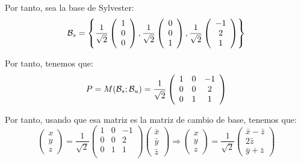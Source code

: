 \begin{ejercicio}
    Por tanto, sea la base de Sylvester:
    \begin{equation*}
        \mathcal{B}_s = \left\{\frac{1}{\sqrt{2}}\left(\begin{array}{c}
            1 \\ 0 \\ 0
        \end{array}\right),
        \frac{1}{\sqrt{2}}\left(\begin{array}{c}
            0 \\ 0 \\ 1
        \end{array}\right),
        \frac{1}{\sqrt{2}}\left(\begin{array}{c}
            -1 \\ 2 \\ 1
        \end{array}\right)\right\}
    \end{equation*}

    Por tanto, tenemos que:
    \begin{equation*}
        P=M(\mathcal{B}_s;\mathcal{B}_u) = \frac{1}{\sqrt{2}}\left(\begin{array}{ccc}
            1 & 0 & -1 \\
            0 & 0 & 2 \\
            0 & 1 & 1 \\
        \end{array}\right)
    \end{equation*}

    Por tanto, usando que esa matriz es la matriz de cambio de base, tenemos que:
    \begin{equation*}
        \left(\begin{array}{ccc}
            {x} \\ {y} \\ {z}
        \end{array}\right) = \frac{1}{\sqrt{2}}\left(\begin{array}{ccc}
            1 & 0 & -1 \\
            0 & 0 & 2 \\
            0 & 1 & 1 \\
        \end{array}\right)
        \left(\begin{array}{ccc}
            \bar{x} \\ \bar{y} \\ \bar{z}
        \end{array}\right)
        \Longrightarrow
        \left(\begin{array}{ccc}
            {x} \\ {y} \\ {z}
        \end{array}\right) = \frac{1}{\sqrt{2}}\left(\begin{array}{c}
            \bar{x}-\bar{z}\\ 2\bar{z}\\\bar{y}+\bar{z}
        \end{array}\right)
    \end{equation*}


\end{ejercicio}
